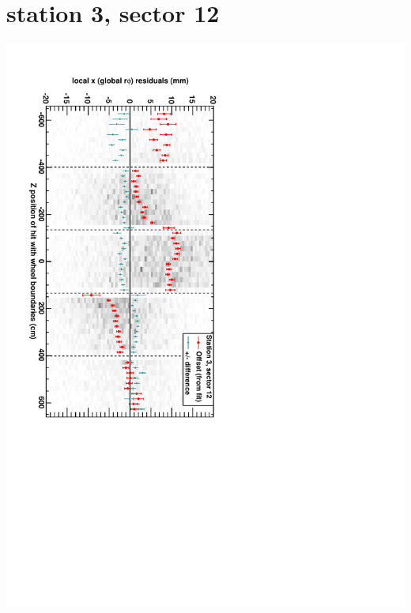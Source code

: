 \documentclass[compress]{beamer}
\begin{document}
\section*{station 3, sector 12}
\begin{frame} \vfill \mbox{\hspace{-1 cm}\includegraphics[height=1.2\linewidth, angle=90]{DTrphiVsZ_st3_sr12.pdf}} \end{frame}
\end{document}
